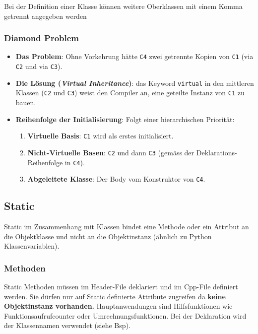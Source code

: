 Bei der Definition einer Klasse können weitere Oberklassen mit einem Komma getrennt angegeben werden
\vspace{-1em}

\subsubsection{Diamond Problem}

\begin{itemize}
    \item \textbf{Das Problem}: Ohne Vorkehrung hätte \texttt{C4} zwei getrennte Kopien von \texttt{C1} (via \texttt{C2} und via \texttt{C3}). 
    \item \textbf{Die Lösung (\textit{Virtual Inheritance})}: das Keyword \texttt{virtual} in den mittleren Klassen (\texttt{C2} und \texttt{C3}) weist den Compiler an, eine geteilte Instanz von \texttt{C1} zu bauen.
    \item \textbf{Reihenfolge der Initialisierung}: Folgt einer hierarchischen Priorität:
    \begin{enumerate}
        \item \textbf{Virtuelle Basis}: \texttt{C1} wird als erstes initialisiert.
        \item \textbf{Nicht-Virtuelle Basen}: \texttt{C2} und dann \texttt{C3} (gemäss der Deklarations-Reihenfolge in \texttt{C4}).
        \item \textbf{Abgeleitete Klasse}: Der Body vom Konstruktor von \texttt{C4}.
    \end{enumerate}
\end{itemize}


\subsection{Static} 

Static im Zusammenhang mit Klassen bindet eine Methode oder ein Attribut an die Objektklasse und nicht an die Objektinstanz (ähnlich zu Python Klassenvariablen). 

\subsubsection{Methoden}

Static Methoden müssen im Header-File deklariert und im Cpp-File definiert werden. 
Sie dürfen nur auf Static definierte Attribute zugreifen da \textbf{keine Objektinstanz vorhanden.} 
Hauptanwendungen sind Hilfsfunktionen wie Funktionsaufrufcounter oder Umrechnungsfunktionen. 
Bei der Deklaration wird der Klassennamen verwendet (siehe Bsp). 

